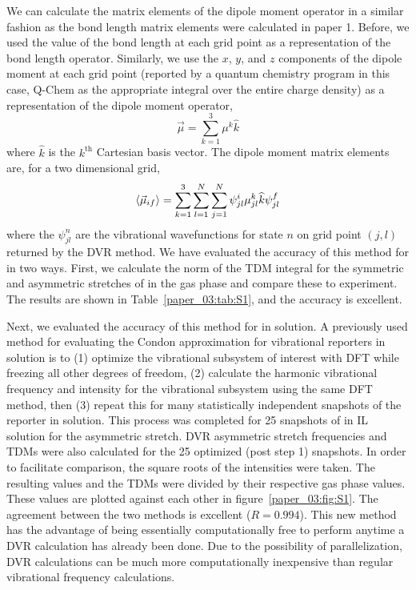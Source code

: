 \documentclass[%
  class = book,%
  crop = false,%
  float = true,%
  multi = true,%
  preview = false,%
]{standalone}
\begin{document}
We can calculate the matrix elements of the dipole moment operator in a similar fashion as the bond length matrix elements were calculated in paper 1. Before, we used the value of the bond length at each grid point as a representation of the bond length operator. Similarly, we use the \(x\), \(y\), and \(z\) components of the dipole moment at each grid point (reported by a quantum chemistry program \textemdash{} in this case, Q-Chem\cite{Shao2015} \textemdash{} as the appropriate integral over the entire charge density) as a representation of the dipole moment operator,
\begin{equation}
  \label{paper_03:eq:S2}
  \vec{\mu} = \sum_{k = 1}^{3} \mu^k \widehat{k}
\end{equation}
where \(\widehat{k}\) is the \(k^{\text{th}}\) Cartesian basis vector. The dipole moment matrix elements are, for a two dimensional grid,
\begin{equation}
  \label{paper_03:eq:S3}
  \Braket{ \vec{\mu}_{if} } = \sum_{k = 1}^{3} \sum_{l = 1}^{N} \sum_{j = 1}^{N} \psi_{jl}^{i} \mu_{jl}^{k} \widehat{k} \psi_{jl}^{f}
\end{equation}
where the \(\psi_{jl}^{n}\) are the vibrational wavefunctions for state \(n\) on grid point \((j,l)\) returned by the DVR method. We have evaluated the accuracy of this method for  in two ways. First, we calculate the norm of the TDM integral for the symmetric and asymmetric stretches of  in the gas phase and compare these to experiment.\cite{DOWNING197566} The results are shown in Table~\ref{paper_03:tab:S1}, and the accuracy is excellent.

Next, we evaluated the accuracy of this method for  in solution. A previously used method for evaluating the Condon approximation for vibrational reporters in solution is to (1) optimize the vibrational subsystem of interest with DFT while freezing all other degrees of freedom, (2) calculate the harmonic vibrational frequency and intensity for the vibrational subsystem using the same DFT method, then (3) repeat this for many statistically independent snapshots of the reporter in solution.\cite{schmidt_pronounced_2005-1} This process was completed for \num{25} snapshots of  in IL solution for the asymmetric stretch. DVR asymmetric stretch frequencies and TDMs were also calculated for the \num{25} optimized (post step 1) snapshots. In order to facilitate comparison, the square roots of the intensities were taken. The resulting values and the TDMs were divided by their respective gas phase values. These values are plotted against each other in figure~\ref{paper_03:fig:S1}. The agreement between the two methods is excellent (\(R = 0.994\)). This new method has the advantage of being essentially computationally free to perform anytime a DVR calculation has already been done. Due to the possibility of parallelization, DVR calculations can be much more computationally inexpensive than regular vibrational frequency calculations.
\end{document}
